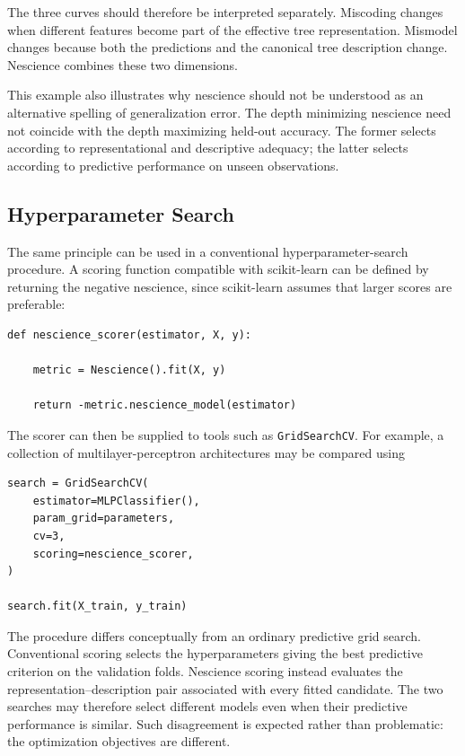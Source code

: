 \begin{example}
The three curves should therefore be interpreted separately. Miscoding changes when different features become part of the effective tree representation. Mismodel changes because both the predictions and the canonical tree description change. Nescience combines these two dimensions.
\end{example}

This example also illustrates why nescience should not be understood as an alternative spelling of generalization error. The depth minimizing nescience need not coincide with the depth maximizing held-out accuracy. The former selects according to representational and descriptive adequacy; the latter selects according to predictive performance on unseen observations.


\subsection*{Hyperparameter Search}

The same principle can be used in a conventional hyperparameter-search procedure. A scoring function compatible with scikit-learn can be defined by returning the negative nescience, since scikit-learn assumes that larger scores are preferable:

\begin{sourcecode}
{\scriptsize
\begin{verbatim}
def nescience_scorer(estimator, X, y):

    metric = Nescience().fit(X, y)

    return -metric.nescience_model(estimator)
\end{verbatim}}
\end{sourcecode}

The scorer can then be supplied to tools such as \texttt{GridSearchCV}. For example, a collection of multilayer-perceptron architectures may be compared using

\begin{sourcecode}
{\scriptsize
\begin{verbatim}
search = GridSearchCV(
    estimator=MLPClassifier(),
    param_grid=parameters,
    cv=3,
    scoring=nescience_scorer,
)

search.fit(X_train, y_train)
\end{verbatim}}
\end{sourcecode}

The procedure differs conceptually from an ordinary predictive grid search. Conventional scoring selects the hyperparameters giving the best predictive criterion on the validation folds. Nescience scoring instead evaluates the representation--description pair associated with every fitted candidate. The two searches may therefore select different models even when their predictive performance is similar. Such disagreement is expected rather than problematic: the optimization objectives are different.


